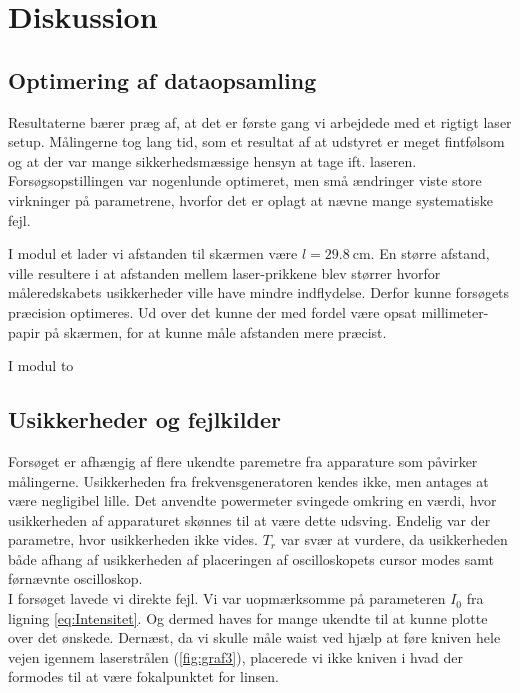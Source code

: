 \documentclass[main]{subfiles}
\begin{document}
\section{Diskussion}
\subsection{Optimering af dataopsamling}
Resultaterne bærer præg af, at det er første gang vi arbejdede med et rigtigt laser setup. Målingerne tog lang tid, som et resultat af at udstyret er meget fintfølsom og at der var mange sikkerhedsmæssige hensyn at tage ift. laseren. Forsøgsopstillingen var nogenlunde optimeret, men små ændringer viste store virkninger på parametrene, hvorfor det er oplagt at nævne mange systematiske fejl.

I modul et lader vi afstanden til skærmen være $l = \SI{29,8}{\centi\meter}$. En større afstand, ville resultere i at afstanden mellem laser-prikkene blev størrer hvorfor måleredskabets usikkerheder ville have mindre indflydelse. Derfor kunne forsøgets præcision optimeres. Ud over det kunne der med fordel være opsat millimeter-papir på skærmen, for at kunne måle afstanden mere præcist.

I modul to 

\subsection{Usikkerheder og fejlkilder}
Forsøget er afhængig af flere ukendte paremetre fra apparature som påvirker målingerne. Usikkerheden fra frekvensgeneratoren kendes ikke, men antages at være negligibel lille. Det anvendte powermeter svingede omkring en værdi, hvor usikkerheden af apparaturet skønnes til at være dette udsving. Endelig var der parametre, hvor usikkerheden ikke vides. $T_r$ var svær at vurdere, da usikkerheden både afhang af usikkerheden af placeringen af oscilloskopets cursor modes samt førnævnte oscilloskop.
\\
I forsøget lavede vi direkte fejl. Vi var uopmærksomme på  parameteren $I_0$ fra ligning \cref{eq:Intensitet}. Og dermed haves for mange ukendte til at kunne plotte over det ønskede. Dernæst, da vi skulle måle waist ved hjælp at føre kniven hele vejen igennem laserstrålen (\cref{fig:graf3}), placerede vi ikke kniven i hvad der formodes til at være fokalpunktet for linsen.
\end{document}
